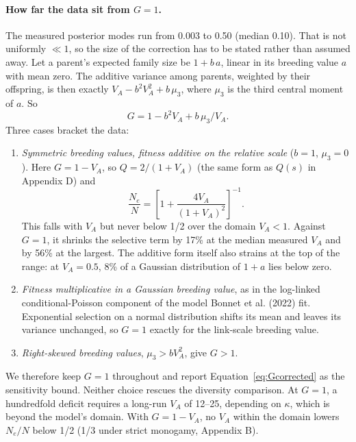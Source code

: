 \documentclass[12pt]{article}
\begin{document}
\paragraph{How far the data sit from $G = 1$.} The measured posterior modes run from 0.003 to 0.50 (median 0.10). That is not uniformly $\ll 1$, so the size of the correction has to be stated rather than assumed away. Let a parent's expected family size be $1 + b\,a$, linear in its breeding value $a$ with mean zero. The additive variance among parents, weighted by their offspring, is then exactly $V_A - b^2V_A^2 + b\,\mu_3$, where $\mu_3$ is the third central moment of $a$. So
\begin{equation}
    G = 1 - b^2 V_A + b\,\mu_3/V_A. \label{eq:G}
\end{equation}
Three cases bracket the data:
\begin{enumerate}
    \item \emph{Symmetric breeding values, fitness additive on the relative scale} ($b = 1$, $\mu_3 = 0$). Here $G = 1 - V_A$, so $Q = 2/(1+V_A)$ (the same form as $Q(s)$ in Appendix D) and
    \begin{equation}
        \frac{N_e}{N} = \left[1 + \frac{4V_A}{(1+V_A)^2}\right]^{-1}. \label{eq:Gcorrected}
    \end{equation}
    This falls with $V_A$ but never below 1/2 over the domain $V_A < 1$. Against $G = 1$, it shrinks the selective term by 17\% at the median measured $V_A$ and by 56\% at the largest. The additive form itself also strains at the top of the range: at $V_A = 0.5$, 8\% of a Gaussian distribution of $1 + a$ lies below zero.
    \item \emph{Fitness multiplicative in a Gaussian breeding value}, as in the log-linked conditional-Poisson component of the model Bonnet et al. (2022) fit. Exponential selection on a normal distribution shifts its mean and leaves its variance unchanged, so $G = 1$ exactly for the link-scale breeding value.
    \item \emph{Right-skewed breeding values}, $\mu_3 > bV_A^2$, give $G > 1$.
\end{enumerate}
We therefore keep $G = 1$ throughout and report Equation~\eqref{eq:Gcorrected} as the sensitivity bound. Neither choice rescues the diversity comparison. At $G = 1$, a hundredfold deficit requires a long-run $V_A$ of 12--25, depending on $\kappa$, which is beyond the model's domain. With $G = 1 - V_A$, no $V_A$ within the domain lowers $N_e/N$ below 1/2 (1/3 under strict monogamy, Appendix B).
\end{document}
